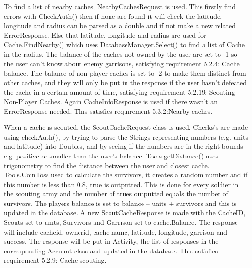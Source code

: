 To find a list of nearby caches, NearbyCachesRequest is used. This firstly find errors with CheckAuth() then if none are found it will check the latitude, longitude and radius can be parsed as a double and if not make a new related ErrorResponse. Else that latitude, longitude and radius are used for Cache.FindNearby() which uses DatabaseManager.Select() to find a list of Cache in the radius. The balance of the caches not owned by the user are set to -1 so the user can't know about enemy garrisons, satisfying requirement 5.2.4: Cache balance. The balance of non-player caches is set to -2 to make them distinct from other caches, and they will only be put in the response if the user hasn't defeated the cache in a certain amount of time, satisfying requirement 5.2.19: Scouting Non-Player Caches. Again CacheInfoResponse is used if there wasn't an ErrorResponse needed. This satisfies requirement 5.3.2:Nearby caches.

When a cache is scouted, the ScoutCacheRequest class is used. Checks's are made using checkAuth(), by trying to parse the Strings representing numbers (e.g. units and latitude) into Doubles, and by seeing if the numbers are in the right bounds e.g. positive or smaller than the user's balance. Tools.getDistance() uses trigonometry to find the distance between the user and closest cache. Tools.CoinToss used to calculate the survivors, it creates a random number and if this number is less than 0.8, true is outputted. This is done for every soldier in the scouting army and the number of trues outputted equals the number of survivors. The players balance is set to balance – units + survivors and this is updated in the database. A new ScoutCacheResponse is made with the CacheID, Scouts set to units, Survivors and Garrison set to cache.Balance. The response will include cacheid, ownerid, cache name, latitude, longitude, garrison and success. The response will be put in Activity, the list of responses in the corresponding Account class and updated in the database. This satisfies requirement 5.2.9: Cache scouting.

